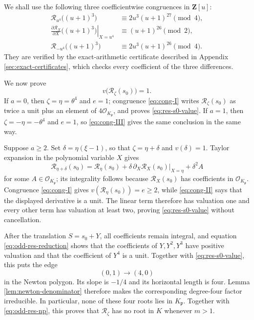 We shall use the following three coefficientwise congruences in
$\mathbf Z[u]$:
\begin{align}
 \mathcal R_{u^4}\bigl((u+1)^3\bigr)
 &\equiv2u^3(u+1)^{27}\pmod4,
 \label{eq:cong-I}\\
 \left.
 \frac{\partial\mathcal R_X}{\partial X}\bigl((u+1)^3\bigr)
 \right|_{X=u^4}
 &\equiv(u+1)^{26}\pmod2,
 \label{eq:cong-II}\\
 \mathcal R_{-u^4}\bigl((u+1)^3\bigr)
 &\equiv2u^3(u+1)^{26}\pmod4.
 \label{eq:cong-III}
\end{align}
They are verified by the exact-arithmetic certificate described in
Appendix \ref{sec:exact-certificates}, which checks every coefficient of
the three differences.

We now prove
\begin{equation}\label{eq:res-s0-value}
 v\bigl(\mathcal R_\zeta(s_0)\bigr)=1.
\end{equation}
If $a=0$, then $\zeta=\eta=\theta^4$ and $e=1$; congruence
\eqref{eq:cong-I} writes $\mathcal R_\zeta(s_0)$ as twice a unit plus an
element of $4\mathcal O_{K_{\mathfrak p}}$, and proves
\eqref{eq:res-s0-value}.  If $a=1$, then $\zeta=-\eta=-\theta^4$ and
$e=1$, so \eqref{eq:cong-III} gives the same conclusion in the same way.

Suppose $a\ge2$.  Set $\delta=\eta(\xi-1)$, so that
$\zeta=\eta+\delta$ and $v(\delta)=1$.  Taylor expansion in the
polynomial variable $X$ gives
\[
 \mathcal R_{\eta+\delta}(s_0)
 =\mathcal R_\eta(s_0)
  +\delta\,\partial_X\mathcal R_X(s_0)|_{X=\eta}
  +\delta^2A
\]
for some $A\in\mathcal O_{K_{\mathfrak p}}$; its integrality follows
because $\mathcal R_X(s_0)$ has coefficients in
$\mathcal O_{K_{\mathfrak p}}$.  Congruence
\eqref{eq:cong-I} gives
$v(\mathcal R_\eta(s_0))=e\ge2$, while
\eqref{eq:cong-II} says that the displayed derivative is a unit.  The
linear term therefore has valuation one and every other term has
valuation at least two, proving \eqref{eq:res-s0-value} without
cancellation.

After the translation $S=s_0+Y$, all coefficients remain integral, and equation
\eqref{eq:odd-res-reduction} shows that the coefficients of
$Y,Y^2,Y^3$ have positive valuation and that the coefficient of $Y^4$
is a unit.  Together with \eqref{eq:res-s0-value}, this puts the edge
\[
 (0,1)\longrightarrow(4,0)
\]
in the Newton polygon.  Its slope is $-1/4$ and its horizontal length is
four.  Lemma \ref{lem:newton-denominator} therefore makes the
corresponding degree-four factor irreducible.  In particular, none of
these four roots lies in $K_{\mathfrak p}$.  Together with
\eqref{eq:odd-res-np}, this proves that $\mathcal R_\zeta$ has no root in
$K$ whenever $m>1$.

